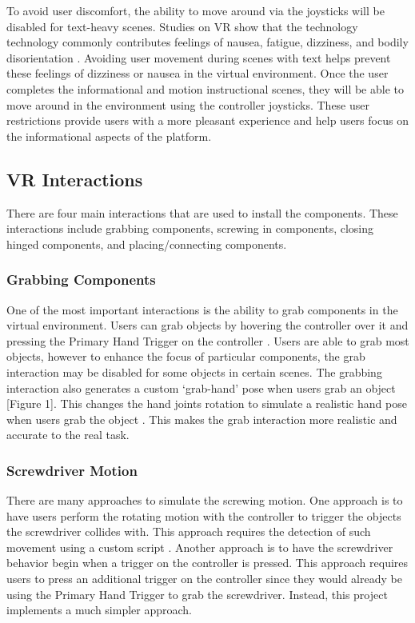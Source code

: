 \documentclass[10pt,twocolumn]{article}
\begin{document}
\par To avoid user discomfort, the ability to move around via the joysticks will be disabled for text-heavy scenes. Studies on VR show that the technology technology commonly contributes feelings of nausea, fatigue, dizziness, and bodily disorientation \cite{Spiegel2018TheEthicsOf}. Avoiding user movement during scenes with text helps prevent these feelings of dizziness or nausea in the virtual environment. Once the user completes the informational and motion instructional scenes, they will be able to move around in the environment using the controller joysticks. These user restrictions provide users with a more pleasant experience and help users focus on the informational aspects of the platform. 

\subsection{VR Interactions}

\par There are four main interactions that are used to install the components. These interactions include grabbing components, screwing in components, closing hinged components, and placing/connecting components. 

\subsubsection{Grabbing Components}

\par One of the most important interactions is the ability to grab components in the virtual environment. Users can grab objects by hovering the controller over it and pressing the Primary Hand Trigger on the controller \cite{Valem2022HowToVR}. Users are able to grab most objects, however to enhance the focus of particular components, the grab interaction may be disabled for some objects in certain scenes. The grabbing interaction also generates a custom ‘grab-hand’ pose when users grab an object [Figure 1]. This changes the hand joints rotation to simulate a realistic hand pose when users grab the object \cite{Valem2022GrabHand}. This makes the grab interaction more realistic and accurate to the real task. 

\subsubsection{Screwdriver Motion}

\par There are many approaches to simulate the screwing motion. One approach is to have users perform the rotating motion with the controller to trigger the objects the screwdriver collides with. This approach requires the detection of such movement using a custom script \cite{Valem2020HowToDetect}. Another approach is to have the screwdriver behavior begin when a trigger on the controller is pressed. This approach requires users to press an additional trigger on the controller since they would already be using the Primary Hand Trigger to grab the screwdriver. Instead, this project implements a much simpler approach. 
\end{document}
